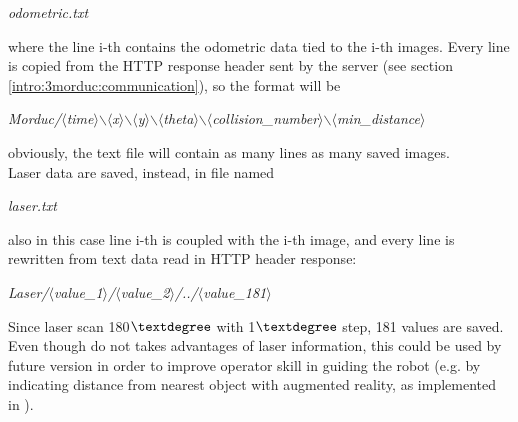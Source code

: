 \begin{center}
  \textit{odometric.txt}
\end{center}

where the line i-th contains the odometric data tied to the i-th
images. Every line is copied from the HTTP response header sent
by the \morduc{} server (see section \ref{intro:3morduc:communication}),
so the format will be

\begin{center}
  \textit{Morduc/$\langle$time$\rangle$$\backslash$$\langle$x$\rangle$$\backslash$$\langle$y$\rangle$$\backslash$$\langle$theta$\rangle$$\backslash$$\langle$collision\_number$\rangle$$\backslash$$\langle$min\_distance$\rangle$}
\end{center}

obviously, the text file will contain as many lines as many
saved images.
\\
Laser data are saved, instead, in file named

\begin{center}
  \textit{laser.txt}
\end{center}

also in this case line i-th is coupled with the i-th image, and
every line is rewritten from text data read in HTTP header
response:

\begin{center}
  \textit{Laser/$\langle$value\_1$\rangle$/$\langle$value\_2$\rangle$/../$\langle$value\_181$\rangle$}
\end{center}

Since laser scan 180$\textdegree$ with 1$\textdegree$ step,
181 values are saved.
\\
Even though \framework{} do not takes
advantages of laser information, this could be used by future
version in order to improve operator skill in guiding the robot
(e.g. by indicating distance from nearest object with augmented
reality, as implemented in \cite{morduc:macalusodetommaso}).
